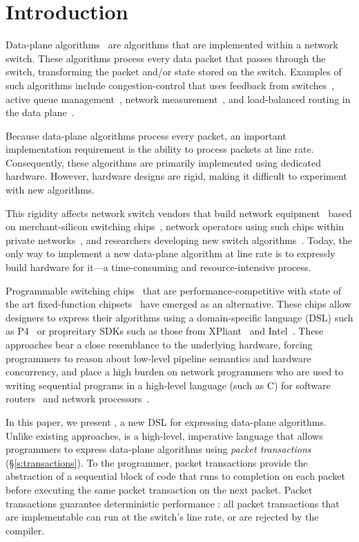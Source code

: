 \section{Introduction}
\label{s:intro}

Data-plane algorithms~\cite{cestan} are algorithms that are implemented within
a network switch. These algorithms process every data packet that passes
through the switch, transforming the packet and/or state stored on the switch.
Examples of such algorithms include congestion-control that uses feedback from
switches~\cite{xcp, rcp, pdq, dctcp}, active queue management~\cite{codel},
network measurement~\cite{opensketch, bitmap_george, elephant_george}, and
load-balanced routing in the data plane~\cite{conga}.

Because data-plane algorithms process every packet, an important implementation
requirement is the ability to process packets at line rate.  Consequently,
these algorithms are primarily implemented using dedicated hardware. However,
hardware designs are rigid, making it difficult to experiment with new
algorithms.

This rigidity affects network switch vendors that build network
equipment~\cite{cisco_nexus, dell_force10, arista_7050} based on
merchant-silicon switching chips~\cite{trident, tomahawk, mellanox}, network
operators using such chips within private networks~\cite{google,facebook,vl2},
and researchers developing new switch algorithms~\cite{xcp, codel, d3, detail,
pdq}. Today, the only way to implement a new data-plane algorithm at line rate
is to expressly build hardware for it---a time-consuming and resource-intensive
process.

Programmable switching chips~\cite{flexpipe, xpliant, rmt} that are
performance-competitive with state of the art fixed-function
chipsets~\cite{trident, tomahawk, mellanox} have emerged as an alternative.
These chips allow designers to express their algorithms using a domain-specific
language (DSL) such as P4~\cite{p4} or propreitary SDKs such as those from
XPliant~\cite{xpliant_sdk, xpliant_sdk2} and Intel~\cite{intel_sdk}.  These
approaches bear a close resemblance to the underlying hardware, forcing
programmers to reason about low-level pipeline semantics and hardware
concurrency, and place a high burden on network programmers who are used to
writing sequential programs in a high-level language (such as C) for software
routers~\cite{click} and network processors~\cite{ixp4xx, ixp2800}.

In this paper, we present \pktlanguage, a new DSL for expressing data-plane
algorithms. Unlike existing approaches, \pktlanguage is a high-level,
imperative language that allows programmers to express data-plane algorithms
using {\em packet transactions} (\S\ref{s:transactions}). To the programmer,
packet transactions provide the abstraction of a sequential block of code that
runs to completion on each packet before executing the same packet transaction
on the next packet. Packet transactions guarantee deterministic performance :
all packet transactions that are implementable can run at the switch's line
rate, or are rejected by the compiler.

